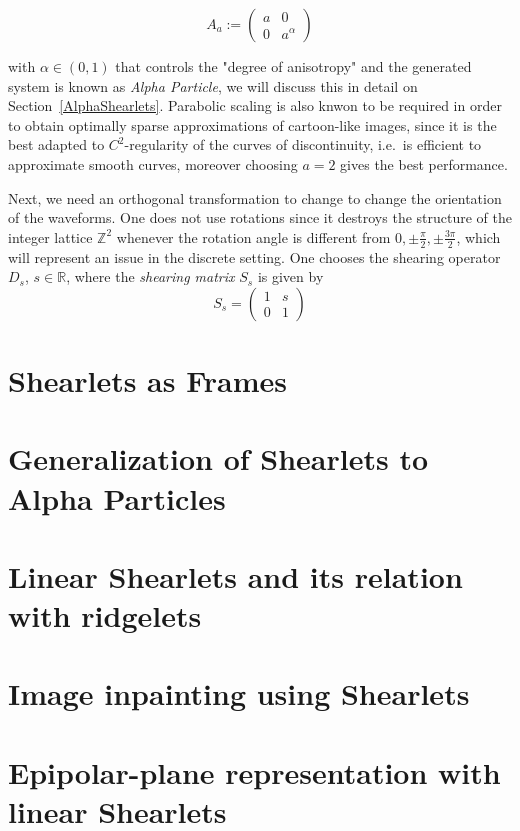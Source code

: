$$
A_a:=
\left(
\begin{matrix}
a & 0 \\
0 & a^{\alpha}
\end{matrix}
\right)
$$

with $\alpha\in (0,1)$ that controls the "degree of anisotropy" and the generated system is known as \textit{Alpha Particle}, we will discuss this in detail on Section~\ref{AlphaShearlets}. Parabolic scaling is also knwon to be required in order to obtain optimally sparse approximations of cartoon-like images, since it is the best adapted to $C^2$-regularity of the curves of discontinuity, i.e.\ is efficient to approximate smooth curves, moreover choosing $a=2$ gives the best performance.

\bigskip

 Next, we need an orthogonal transformation to change to change the orientation of the waveforms. One does not use rotations since it destroys the structure of the integer lattice $\mathbb{Z}^2$ whenever the rotation angle is different from $0,\pm\frac{\pi}{2},\pm\frac{3\pi}{2}$, which will represent an issue in the discrete setting. One chooses the shearing operator $D_s$, $s\in\mathbb{R}$, where the \textit{shearing matrix} $S_s$ is given by 
$$
S_s=
\left(
\begin{matrix}
1 & s \\
0 & 1
\end{matrix}
\right)
$$



\section{Shearlets as Frames}
\label{sec:ShearletsFrames}

\section{Generalization of Shearlets to Alpha Particles}
\label{sec:AlphaShearlets}

\section{Linear Shearlets and its relation with ridgelets}

\section{Image inpainting using Shearlets}

\section{Epipolar-plane representation with linear Shearlets}
